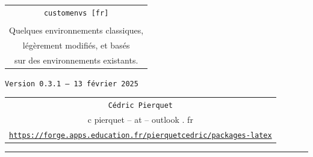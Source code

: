 \documentclass[french,11pt,a4paper]{article}
\def\TPversion{0.3.1}
\def\TPdate{13 février 2025}
\begin{document}
\pagestyle{fancy}

\thispagestyle{empty}

\begin{center}
	\begin{minipage}{0.75\linewidth}
	\begin{tcolorbox}[colframe=yellow,colback=yellow!15]
		\begin{center}
			\renewcommand\arraystretch{1.25}
			\begin{tabular}{c}
				{\Huge \texttt{customenvs [fr]}}\\
				\\
				{\Large Quelques environnements classiques,} \\
				{\Large légèrement modifiés, et basés} \\
				{\Large sur des environnements existants.} \\
			\end{tabular}
			\renewcommand\arraystretch{1}
			
			\medskip
			
			{\small \texttt{Version \TPversion{} -- \TPdate}}
		\end{center}
	\end{tcolorbox}
\end{minipage}
\end{center}

\vspace*{1mm}

\begin{center}
	\begin{tabular}{c}
	\texttt{Cédric Pierquet}\\
	{\ttfamily c pierquet -- at -- outlook . fr}\\
	\texttt{\url{https://forge.apps.education.fr/pierquetcedric/packages-latex}}
\end{tabular}
\end{center}

\vspace*{5mm}

%
%
%
%
%

\hrule


\hypertarget{matoc}{}
\end{document}
